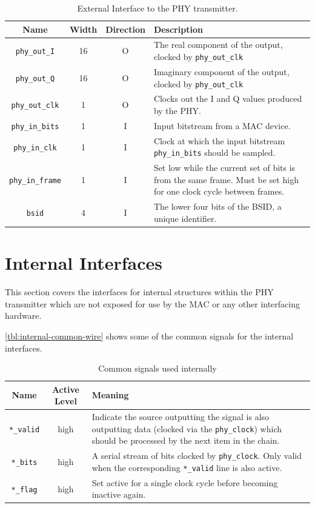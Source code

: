 \documentclass[dvips,10pt,twocolumn]{article}
\begin{document}
\begin{table} \begin{tabularx}{\textwidth}{c|c|c|X}
	\label{tbl:extern-io}
	Name & Width & Direction & Description\\ \hline

	\texttt{phy\_out\_I} & 16 & O & The real component of the output,
	clocked by \texttt{phy\_out\_clk} \\

	\texttt{phy\_out\_Q} & 16 & O & Imaginary component of the output,
	clocked by \texttt{phy\_out\_clk} \\

	\texttt{phy\_out\_clk} & 1 & O & Clocks out the I and Q values
	produced by the PHY. \\

	\texttt{phy\_in\_bits} & 1 & I & Input bitstream from a MAC
	device. \\

	\texttt{phy\_in\_clk} & 1 & I & Clock at which the input bitstream
	\texttt{phy\_in\_bits} should be sampled. \\

	\texttt{phy\_in\_frame} & 1 & I & Set low while the current set of
	bits is from the same frame. Must be set high for one clock cycle
	between frames. \\

	\texttt{bsid} & 4 & I & The lower four bits of the BSID, a unique
	identifier.
\end{tabularx}
\caption{External Interface to the PHY transmitter.}
\end{table}

\section{Internal Interfaces}
This section covers the interfaces for internal structures within the PHY
transmitter which are not exposed for use by the MAC or any other interfacing
hardware.

\autoref{tbl:internal-common-wire} shows some of the common signals for
the internal interfaces.

\begin{table}
\begin{tabulary}{\textwidth}{c|C|L}
	\label{tbl:internal-common-wire}
	Name & Active Level & Meaning \\ \hline
	
	\texttt{*\_valid} & high & Indicate the source outputting the signal
	is also outputting data (clocked via the \texttt{phy\_clock}) which
	should be processed by the next item in the chain. \\

	\texttt{*\_bits} & high & A serial stream of bits clocked by
	\texttt{phy\_clock}. Only valid when the corresponding
	\texttt{*\_valid} line is also active. \\

	\texttt{*\_flag} & high & Set active for a single clock cycle
	before becoming inactive again.
\end{tabulary}
\caption{Common signals used internally}
\end{table}
\end{document}
